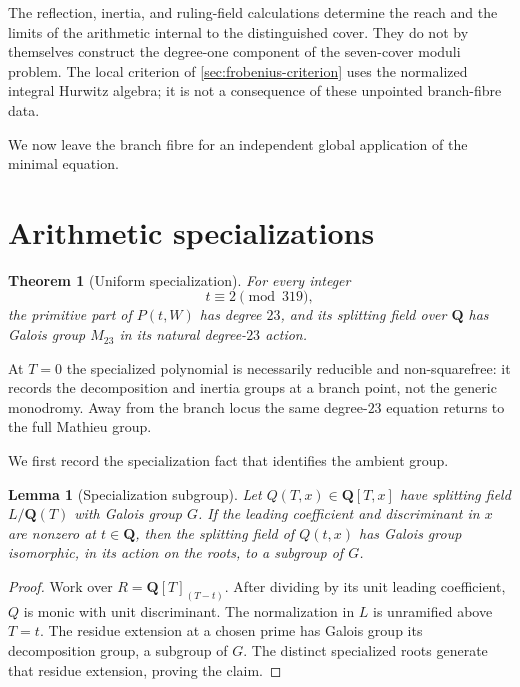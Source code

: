 \documentclass[11pt]{amsart}
\newtheorem{theorem}{Theorem}[section]
\newtheorem{lemma}[lemma]{Lemma}
\theoremstyle{definition}
\theoremstyle{remark}
\newcommand{\QQ}{\mathbf Q}
\begin{document}
The reflection, inertia, and ruling-field calculations determine the reach
and the limits of the arithmetic internal to the distinguished cover.  They
do not by themselves construct the degree-one component of the seven-cover
moduli problem.  The local criterion of \cref{sec:frobenius-criterion}
uses the normalized integral Hurwitz algebra; it is not a consequence of
these unpointed branch-fibre data.

We now leave the branch fibre for an independent global application of the
minimal equation.

\section{Arithmetic specializations}
\label{sec:unramified-specializations}

\begin{theorem}[Uniform specialization]\label{thm:specialization}
For every integer
\[
 t\equiv2\pmod{319},
\]
the primitive part of $P(t,W)$ has degree $23$, and its splitting field over
$\QQ$ has Galois group $M_{23}$ in its natural degree-$23$ action.
\end{theorem}



At $T=0$ the specialized polynomial is necessarily reducible and
non-squarefree: it records the decomposition and inertia groups at a branch
point, not the generic monodromy.  Away from the branch locus the same
degree-$23$ equation returns to the full Mathieu group.

We first record the specialization fact that identifies the ambient group.

\begin{lemma}[Specialization subgroup]\label{lem:specialization-subgroup}
Let $Q(T,x)\in\QQ[T,x]$ have splitting field $L/\QQ(T)$ with Galois group
$G$.  If the leading coefficient and discriminant in $x$ are nonzero at
$t\in\QQ$, then the splitting field of $Q(t,x)$ has Galois group isomorphic,
in its action on the roots, to a subgroup of $G$.
\end{lemma}

\begin{proof}
Work over $R=\QQ[T]_{(T-t)}$.  After dividing by its unit leading
coefficient, $Q$ is monic with unit discriminant.  The normalization in $L$
is unramified above $T=t$.  The residue extension at a chosen prime has
Galois group its decomposition group, a subgroup of $G$.  The distinct
specialized roots generate that residue extension, proving the claim.
\end{proof}
\end{document}
